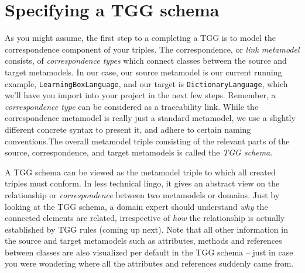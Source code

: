 \newpage
\section{Specifying a TGG schema}
\genHeader

As you might assume, the first step to a completing a TGG is to model the correspondence component of your triples. The correspondence, or \emph{link metamodel}
consists, of \emph{correspondence types} which connect classes between the source and target metamodels. In our case, our source metamodel is our
current running example, \texttt{LearningBoxLanguage}, and our target is \texttt{DictionaryLanguage}, which we'll have you import into your project in the next
few steps. Remember, a \emph{correspondence type} can be considered as a traceability link. While the correspondence metamodel is really just a standard
metamodel, we use a slightly different concrete syntax to present it, and adhere to certain naming conventions.The overall metamodel triple
consisting of the relevant parts of the source, correspondence, and target metamodels is called the \emph{TGG schema}.

A TGG schema can be viewed as the metamodel triple to which all created triples must conform. In less technical lingo, it gives an abstract view on the
relationship or \emph{correspondence} between two metamodels or domains. Just by looking at the TGG schema, a domain expert should understand \emph{why} the
connected elements are related, irrespective of \emph{how} the relationship is actually established by TGG rules (coming up next). Note that all other
information in the source and target metamodels such as attributes, methods and references between classes are also visualized per default in the TGG schema --
just in case you were wondering where all the attributes and references suddenly came from.





